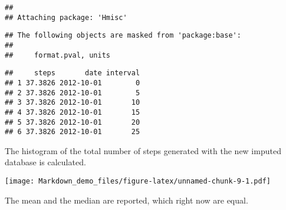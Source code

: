 \documentclass[]{article}
\newenvironment{Shaded}{\begin{snugshade}}{\end{snugshade}}
\newcommand{\KeywordTok}[1]{\textcolor[rgb]{0.13,0.29,0.53}{\textbf{#1}}}
\newcommand{\DataTypeTok}[1]{\textcolor[rgb]{0.13,0.29,0.53}{#1}}
\newcommand{\DecValTok}[1]{\textcolor[rgb]{0.00,0.00,0.81}{#1}}
\newcommand{\StringTok}[1]{\textcolor[rgb]{0.31,0.60,0.02}{#1}}
\newcommand{\OperatorTok}[1]{\textcolor[rgb]{0.81,0.36,0.00}{\textbf{#1}}}
\newcommand{\NormalTok}[1]{#1}
\begin{document}
\begin{verbatim}
## 
## Attaching package: 'Hmisc'
\end{verbatim}

\begin{verbatim}
## The following objects are masked from 'package:base':
## 
##     format.pval, units
\end{verbatim}

\begin{Shaded}
\end{Shaded}

\begin{verbatim}
##     steps       date interval
## 1 37.3826 2012-10-01        0
## 2 37.3826 2012-10-01        5
## 3 37.3826 2012-10-01       10
## 4 37.3826 2012-10-01       15
## 5 37.3826 2012-10-01       20
## 6 37.3826 2012-10-01       25
\end{verbatim}

The histogram of the total number of steps generated with the new
imputed database is calculated.

\begin{Shaded}
\end{Shaded}

\texttt{[image: Markdown\_demo\_files/figure-latex/unnamed-chunk-9-1.pdf]}

The mean and the median are reported, which right now are equal.
\end{document}
